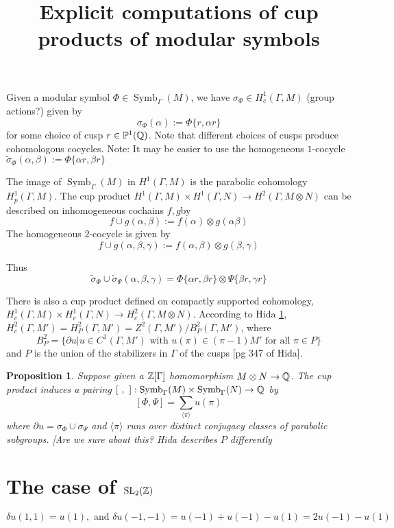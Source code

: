 \documentclass[12pt]{article}
\newtheorem{prop}[thm]{Proposition}
\theoremstyle{definition}
\def\Z{{\Bbb Z}}
\def\Q{{\Bbb Q}}
\def\P{\mathbb{P}}
\def\SL{\operatorname{SL}}
\def\Symb{\operatorname{Symb}}
\def\P{\mathbb{P}}
\begin{document}
\title{Explicit computations of cup products of modular symbols}

\maketitle


Given a modular symbol $\Phi\in\Symb_\Gamma(M)$, we have $\sigma_\Phi \in H^1_c(\Gamma,M)$ (group actions?) given by
$$\sigma_\Phi(\alpha) :=\Phi\{r,\alpha r\}$$
for some choice of cusp $r\in \P^1(\Q)$. Note that different choices of cusps produce cohomologous cocycles.
Note: It may be easier to use the homogeneous $1$-cocycle $\widetilde{\sigma}_{\Phi}(\alpha,\beta):=\Phi\{\alpha r,\beta r\}$

The image of $\Symb_\Gamma(M)$ in $H^1(\Gamma,M)$ is the parabolic cohomology $H^1_p(\Gamma,M)$. The cup product  $H^1(\Gamma,M)\times H^1(\Gamma,N)\rightarrow H^2(\Gamma,M\otimes N)$ can be described on inhomogeneous cochains $f,g$by
$$ f\cup g (\alpha,\beta):=f(\alpha)\otimes g(\alpha\beta)$$
The homogeneous $2$-cocycle is given by
$$ f\cup g (\alpha,\beta,\gamma):=f(\alpha,\beta) \otimes g(\beta,\gamma)$$

Thus
$$\widetilde{\sigma}_\Phi \cup \widetilde{\sigma}_\Psi(\alpha,\beta,\gamma)= \Phi\{\alpha r,\beta r\}\otimes\Psi\{\beta r,\gamma r\}$$

There is also a cup product defined on compactly supported cohomology, $H^1_c(\Gamma,M)\times H^1_c(\Gamma,N)\rightarrow H^2_c(\Gamma,M\otimes N)$. According to Hida \ref{}, $H^2_c(\Gamma, M')=H^2_P(\Gamma,M')=Z^2(\Gamma,M')/B_P^2(\Gamma,M')$, where
$$
B^2_P = \{\partial u | u\in C^1(\Gamma, M') \text{ with } u(\pi)\in (\pi-1)M' \text{ for all } \pi\in P\}
$$
and $P$ is the union of the stabilizers in $\Gamma$ of the cusps [pg 347 of Hida].
\begin{prop}
Suppose given a $\Z[\Gamma]$ homomorphism $M\otimes N\rightarrow \Q$. The cup product induces a pairing $[~,~] : \Symb_\Gamma(M)\times \Symb_\Gamma(N) \rightarrow \Q$ by
$$[\Phi,\Psi]=\sum_{\langle \pi\rangle } u(\pi)$$
where $\partial u= \sigma_\Phi \cup \sigma_\Psi$ and $\langle \pi\rangle $ runs over distinct conjugacy classes of parabolic subgroups. [Are we sure about this? Hida describes $P$ differently
\end{prop}

\section{The case of $\SL_2(\Z)$}
\begin{equation*}
	\delta u(1,1)=u(1), \text{ and } \delta u(-1,-1) =u(-1)+u(-1)-u(1)=2u(-1)-u(1)
\end{equation*}
\end{document}
